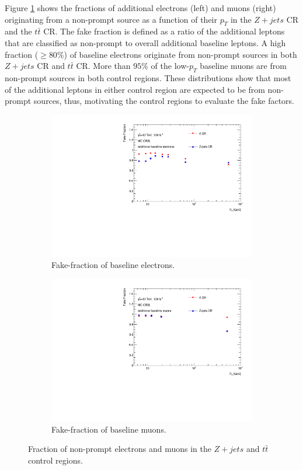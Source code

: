 Figure \ref{fig:FakeFractionBaseline} shows the fractions of additional electrons (left) and muons (right) originating from a non-prompt source as a function of their $p_{T}$ in the $Z+jets$ CR and the $t\bar{t}$ CR. The fake fraction is defined as a ratio of the additional leptons that are classified as non-prompt to overall additional baseline leptons. A high fraction ($\geq 80\%$) of baseline electrons originate from non-prompt sources in both $Z+jets$ CR and $t\bar{t}$ CR. More than $95\%$ of the low-$p_{T}$ baseline muons are from non-prompt sources in both control regions. These distributions show that most of the additional leptons in either control region are expected to be from non-prompt sources, thus,  motivating the control regions to evaluate the fake factors.

\begin{figure}[!htb]
    \begin{subfigure}{.48\textwidth}
        \centering
        \includegraphics[width=.9\linewidth]{figures/Analysis/Background/FakeFractionBaselineElectrons.pdf}
        \caption{Fake-fraction of baseline electrons.}
    \end{subfigure}
    \begin{subfigure}{.48\textwidth}
        \centering
        \includegraphics[width=.9\linewidth]{figures/Analysis/Background/FakeFractionBaselineMuons.pdf}
        \caption{Fake-fraction of baseline muons.}
    \end{subfigure}
        \caption{Fraction of non-prompt electrons and muons in the $Z+jets$ and $t\bar{t}$ control regions. \label{fig:FakeFractionBaseline}}
\end{figure}

